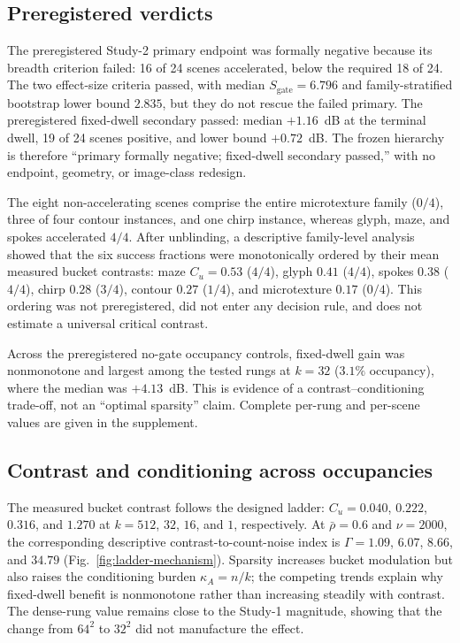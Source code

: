 \documentclass[10pt,twocolumn]{article}
\newcommand{\rhobar}{\bar{\rho}}
\newcommand{\Cu}{C_{u}}
\begin{document}
\subsection{Preregistered verdicts}
The preregistered Study-2 primary endpoint was formally negative because its breadth criterion failed: 16 of 24 scenes accelerated, below the required 18 of 24.
The two effect-size criteria passed, with median
$S_{\mathrm{gate}}=6.796$ and family-stratified bootstrap lower bound $2.835$,
but they do not rescue the failed primary. The preregistered fixed-dwell
secondary passed: median $+1.16$~dB at the terminal dwell, 19 of 24 scenes
positive, and lower bound $+0.72$~dB. The frozen hierarchy is therefore
``primary formally negative; fixed-dwell secondary passed,'' with no endpoint,
geometry, or image-class redesign.

The eight non-accelerating scenes comprise the entire microtexture family
($0/4$), three of four contour instances, and one chirp instance, whereas
glyph, maze, and spokes accelerated $4/4$. After unblinding, a descriptive
family-level analysis showed that the six success fractions were monotonically
ordered by their mean measured bucket contrasts: maze $\Cu=0.53$ ($4/4$),
glyph $0.41$ ($4/4$), spokes $0.38$ ($4/4$), chirp $0.28$ ($3/4$), contour
$0.27$ ($1/4$), and microtexture $0.17$ ($0/4$). This ordering was not
preregistered, did not enter any decision rule, and does not estimate a
universal critical contrast.

Across the preregistered no-gate occupancy controls, fixed-dwell gain was
nonmonotone and largest among the tested rungs at $k=32$ ($3.1\%$ occupancy),
where the median was $+4.13$~dB. This is evidence of a
contrast--conditioning trade-off, not an ``optimal sparsity'' claim. Complete
per-rung and per-scene values are given in the supplement.

\subsection{Contrast and conditioning across occupancies}
The measured bucket contrast follows the designed ladder: $\Cu=0.040$,
$0.222$, $0.316$, and $1.270$ at $k=512$, $32$, $16$, and $1$,
respectively. At $\rhobar=0.6$ and $\nu=2000$, the corresponding descriptive
contrast-to-count-noise index is $\Gamma=1.09$, $6.07$, $8.66$, and $34.79$
(Fig.~\ref{fig:ladder-mechanism}). Sparsity increases bucket modulation but
also raises the conditioning burden $\kappa_A=n/k$; the competing trends
explain why fixed-dwell benefit is nonmonotone rather than increasing steadily
with contrast. The dense-rung value remains close to the Study-1 magnitude,
showing that the change from $64^2$ to $32^2$ did not manufacture the effect.
\end{document}
